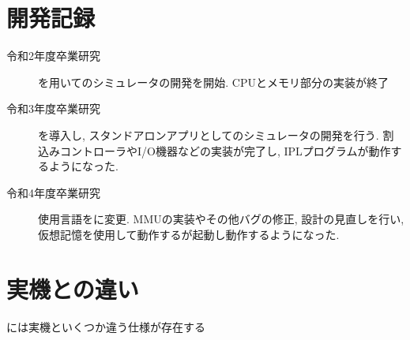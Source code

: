 \section{開発記録}

\begin{description}
    \item[令和2年度卒業研究] \js を用いて\tac のシミュレータの開発を開始. CPUとメモリ部分の実装が終了
    \item[令和3年度卒業研究] \electron を導入し, スタンドアロンアプリとして\tac のシミュレータの開発を行う. 割込みコントローラやI/O機器などの実装が完了し, IPLプログラムが動作するようになった.
    \item[令和4年度卒業研究] 使用言語を\ts に変更. MMUの実装やその他バグの修正, 設計の見直しを行い, 仮想記憶を使用して動作する\tacos が起動し動作するようになった.
\end{description}

\section{実機との違い}

\tacsim には\tac 実機といくつか違う仕様が存在する

\begin{description}
    \item[] 
\end{description}